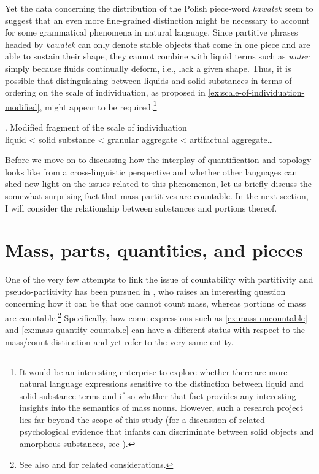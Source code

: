 Yet the data concerning the distribution of the Polish piece-word \textit{kawałek} seem to suggest that an even more fine-grained distinction might be necessary to account for some grammatical phenomena in natural language. Since partitive phrases headed by \textit{kawałek} can only denote stable objects that come in one piece and are able to sustain their shape, they cannot combine with liquid terms such as \textit{water} simply because fluids continually deform, i.e., lack a given shape. Thus, it is possible that distinguishing between liquids and solid substances in terms of ordering on the scale of individuation, as proposed in \ref{ex:scale-of-individuation-modified}, might appear to be required.\footnote{It would be an interesting enterprise to explore whether there are more natural language expressions sensitive to the distinction between liquid and solid substance terms and if so whether that fact provides any interesting insights into the semantics of mass nouns. However, such a research project lies far beyond the scope of this study (for a discussion of related psychological evidence that infants can discriminate between solid objects and amorphous substances, see ).}

\ex. Modified fragment of the scale of individuation\\
liquid < solid substance < granular aggregate < artifactual aggregate\dots\label{ex:scale-of-individuation-modified}

Before we move on to discussing how the interplay of quantification and topology looks like from a cross-linguistic perspective and whether other languages can shed new light on the issues related to this phenomenon, let us briefly discuss the somewhat surprising fact that mass partitives are countable. In the next section, I will consider the relationship between substances and portions thereof.

\section{Mass, parts, quantities, and pieces}\label{sec:mass-parts-quantitifes-and-pieces}\largerpage

One of the very few attempts to link the issue of countability with partitivity and pseudo-partitivity \citep[see, e.g.,][]{selkirk1977some,koptjevskaja2001piece} has been pursued in \citet{chierchia2010mass}, who raises an interesting question concerning how it can be that one cannot count mass, whereas portions of mass are countable.\footnote{See also \citet{khrizman_et-al2015portion} and \citet{landman2016iceberg} for related considerations.} Specifically, how come expressions such as \ref{ex:mass-uncountable} and \ref{ex:mass-quantity-countable} can have a different status with respect to the mass/count distinction and yet refer to the very same entity.

